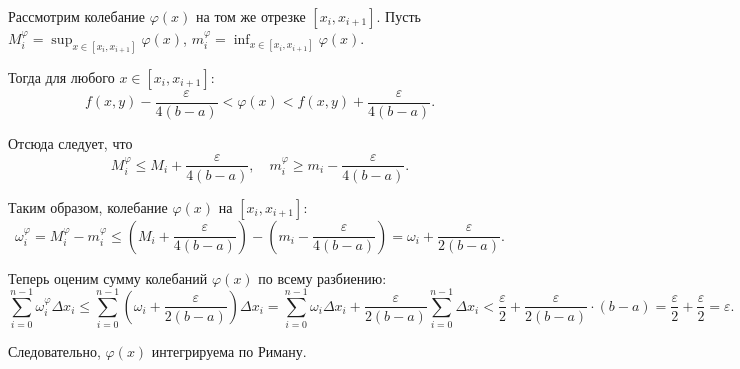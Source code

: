 \documentclass{article}
\begin{document}
Рассмотрим колебание $\varphi(x)$ на том же отрезке $[x_i, x_{i+1}]$. Пусть $M_i^\varphi = \sup_{x \in [x_i, x_{i+1}]} \varphi(x)$, $m_i^\varphi = \inf_{x \in [x_i, x_{i+1}]} \varphi(x)$.

Тогда для любого $x \in [x_i, x_{i+1}]$:
\[
f(x, y) - \frac{\varepsilon}{4(b-a)} < \varphi(x) < f(x, y) + \frac{\varepsilon}{4(b-a)}.
\]

Отсюда следует, что
\[
M_i^\varphi \leq M_i + \frac{\varepsilon}{4(b-a)}, \quad m_i^\varphi \geq m_i - \frac{\varepsilon}{4(b-a)}.
\]

Таким образом, колебание $\varphi(x)$ на $[x_i, x_{i+1}]$:
\[
\omega_i^\varphi = M_i^\varphi - m_i^\varphi \leq \left(M_i + \frac{\varepsilon}{4(b-a)}\right) - \left(m_i - \frac{\varepsilon}{4(b-a)}\right) = \omega_i + \frac{\varepsilon}{2(b-a)}.
\]

Теперь оценим сумму колебаний $\varphi(x)$ по всему разбиению:
\[
\sum_{i=0}^{n-1} \omega_i^\varphi \Delta x_i \leq \sum_{i=0}^{n-1} \left( \omega_i + \frac{\varepsilon}{2(b-a)} \right) \Delta x_i = \sum_{i=0}^{n-1} \omega_i \Delta x_i + \frac{\varepsilon}{2(b-a)} \sum_{i=0}^{n-1} \Delta x_i < \frac{\varepsilon}{2} + \frac{\varepsilon}{2(b-a)} \cdot (b - a) = \frac{\varepsilon}{2} + \frac{\varepsilon}{2} = \varepsilon.
\]

Следовательно, $\varphi(x)$ интегрируема по Риману.
\end{document}
